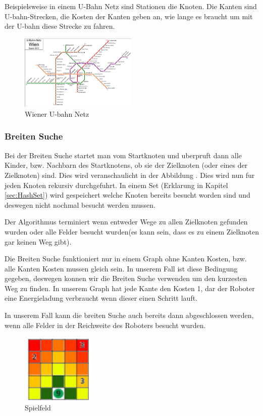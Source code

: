 \documentclass[a4paper,12pt,arial]{scrartcl}
\begin{document}
Beispielsweise in einem U-Bahn Netz sind Stationen die Knoten. Die Kanten sind U-bahn-Strecken, die Kosten der Kanten geben an, wie lange es braucht um mit der U-bahn diese Strecke zu fahren.
\begin{figure}[h]
    \centering
    \includegraphics[width=0.5\textwidth]{u-bahn.pdf}
    \caption{Wiener U-bahn Netz \textcite{wikipediaUbahn}}
    \label{fig:u-bahn-netz}
\end{figure}



\subsubsection{Breiten Suche}


Bei der Breiten Suche startet man vom Startknoten und uberpruft dann alle Kinder, bzw. Nachbarn des Startknotens, ob sie der Zielknoten (oder eines der Zielknoten) sind.
Dies wird veranschaulicht in der Abbildung .
Dies wird nun fur jeden Knoten rekursiv durchgefuhrt.
In einem Set (Erklarung in Kapitel \ref{sec:HashSet}) wird gespeichert welche Knoten bereits besucht worden sind und deswegen nicht nochmal besucht werden mussen.
\par
Der Algorithmus terminiert wenn entweder Wege zu allen Zielknoten gefunden wurden oder alle Felder besucht wurden(es kann sein, dass es zu einem Zielknoten gar keinen Weg gibt).

Die Breiten Suche funktioniert nur in einem Graph ohne Kanten Kosten, bzw. alle Kanten Kosten mussen gleich sein. In unserem Fall ist diese Bedingung gegeben, deswegen konnen wir die Breiten Suche verwenden um den kurzesten Weg zu finden.
In unserem Graph hat jede Kante den Kosten 1, dar der Roboter eine Energieladung verbraucht wenn dieser einen Schritt lauft.
\par
In unserem Fall kann die breiten Suche auch bereits dann abgeschlossen werden, wenn alle Felder in der Reichweite des Roboters besucht wurden.

\begin{figure}
    \includegraphics[width=0.3\textwidth]{Stromrallye_Feld_BFS.pdf}
    \caption{Spielfeld}
    \label{fig:bfs_stromrallye}
    \vspace{-20pt}
\end{figure}
\end{document}
